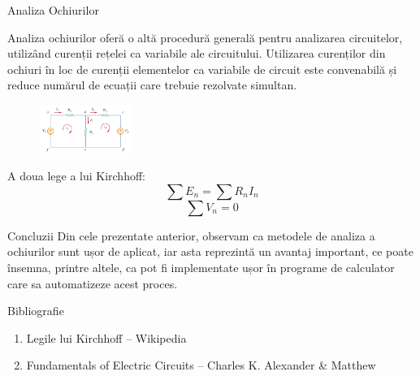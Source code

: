 \documentclass{beamer}
\begin{document}
\begin{frame}{Analiza Ochiurilor}
\par Analiza ochiurilor oferă o altă procedură generală pentru analizarea circuitelor, utilizând curenții rețelei ca variabile ale circuitului. Utilizarea curenților din ochiuri în loc de curenții elementelor ca variabile de circuit este convenabilă și reduce numărul de ecuații care trebuie rezolvate simultan.

\begin{figure}[h]
\includegraphics[width=3cm]{fig2.png}
\centering
\end{figure}

\par A doua lege a lui Kirchhoff:
\[\sum E_n=\sum{R_nI_n}\]
\[\sum V_n=0\]
\end{frame}


\begin{frame}{Concluzii}
Din cele prezentate anterior, observam ca metodele de analiza a ochiurilor sunt ușor de aplicat, iar asta reprezintă un avantaj important, ce poate însemna, printre altele, ca pot fi implementate ușor în programe de calculator care sa automatizeze acest proces.
\end{frame}


\begin{frame}{Bibliografie}
\begin{enumerate}
    \item Legile lui Kirchhoff – Wikipedia
    \item Fundamentals of Electric Circuits – Charles K. Alexander & Matthew
\end{enumerate}
\end{frame}
\end{document}
